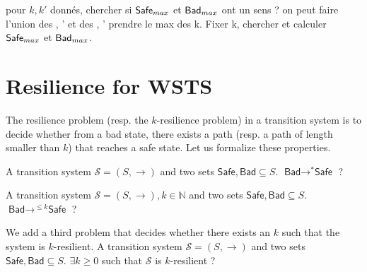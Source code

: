 

pour $k,k'$ donnés, chercher si $\Safe_{max}$ et $\Bad_{max}$ ont un sens ? on peut faire l'union des \Safe, \Safe' et des \Bad, \Bad' prendre le max des k. Fixer k, chercher et calculer $\Safe_{max}$ et $\Bad_{max}$.

%

\fi




\newcommand{\Bad}{\textsf{Bad}}
\newcommand{\Safe}{\textsf{Safe}}



\section{Resilience for WSTS}


The resilience problem (resp. the $k$-resilience problem) in a transition system is to decide whether from a bad state, there exists a path (resp. a path of length smaller than $k$) that reaches a safe state. Let us formalize these properties.

{A transition system $\mathscr{S}=(S,\rightarrow)$ and two sets $\Safe, \Bad \subseteq S$.}
{$\Bad \longrightarrow^{*} \Safe$ ?\newline}
%

{A transition system $\mathscr{S}=(S,\rightarrow), k \in \mathbb{N}$ and two sets $\Safe, \Bad \subseteq S$.}
{$\Bad \longrightarrow^{\leq k} \Safe$ ?\newline}

We add a third problem that decides whether there exists an $k$ such  that the system is $k$-resilient.
%
{A transition system $\mathscr{S}=(S,\rightarrow)$ and two sets $\Safe, \Bad \subseteq S$.}
{$\exists k \geq 0$ such that $\mathscr{S}$ is %
 $k$-resilient ?\newline}

